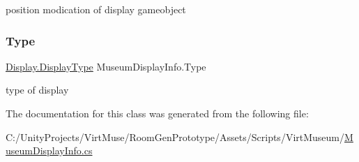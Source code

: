 position modication of display gameobject 

\mbox{\label{class_museum_display_info_a547f4b6e15ae0f48408bf999019955e2}} 
\subsubsection{\texorpdfstring{Type}{Type}}
{\footnotesize\ttfamily \mbox{\hyperlink{class_display_a7f7abc559192ef7e8f4a03382d3492d7}{Display.\+Display\+Type}} Museum\+Display\+Info.\+Type}



type of display 



The documentation for this class was generated from the following file\+:\begin{DoxyCompactItemize}
\item 
C\+:/\+Unity\+Projects/\+Virt\+Muse/\+Room\+Gen\+Prototype/\+Assets/\+Scripts/\+Virt\+Museum/\mbox{\hyperlink{_museum_display_info_8cs}{Museum\+Display\+Info.\+cs}}\end{DoxyCompactItemize}
